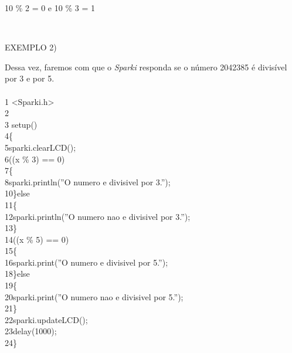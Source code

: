 \documentclass[conference]{IEEEtran}
\begin{document}
\begin{center}
10 \% 2 = 0 e 10 \% 3 = 1
\end{center}
\\
\begin{center}
EXEMPLO 2)
\end{center}
\par
Dessa vez, faremos com que o \textit{Sparki} responda se o número 2042385 é divisível por 3 e por 5.
\\
\\
{\selectfont
{\color{cinza}1} <Sparki.h>\\
{\color{cinza}2}\\
{\color{cinza}3} setup()\\
{\color{cinza}4}\quad\{\\
{\color{cinza}5}\quad\quad sparki.clearLCD();\\
{\color{cinza}6}\quad{}((x \% 3) == 0)\\
{\color{cinza}7}\quad\quad \{\\
{\color{cinza}8}\quad\quad\quad sparki.println({\color{verde}''O numero e divisivel por 3.''});\\
{\color{cinza}10}\quad\quad \}{\color{verde}else}\\
{\color{cinza}11}\quad\quad \{\\
{\color{cinza}12}\quad\quad\quad sparki.println({\color{verde}''O numero nao e divisivel por 3.''});\\
{\color{cinza}13}\quad\quad \}\\
{\color{cinza}14}\quad{}((x \% 5) == 0)\\
{\color{cinza}15}\quad\quad \{\\
{\color{cinza}16}\quad\quad\quad sparki.print({\color{verde}''O numero e divisivel por 5.''});\\
{\color{cinza}18}\quad\quad \}{\color{verde}else}\\
{\color{cinza}19}\quad\quad \{\\
{\color{cinza}20}\quad\quad\quad sparki.print({\color{verde}''O numero nao e divisivel por 5.''});\\
{\color{cinza}21}\quad\quad \}\\
{\color{cinza}22}\quad\quad sparki.updateLCD();\\
{\color{cinza}23}\quad\quad delay(1000);\\
{\color{cinza}24}\quad\}}
\\
\par
\end{document}
